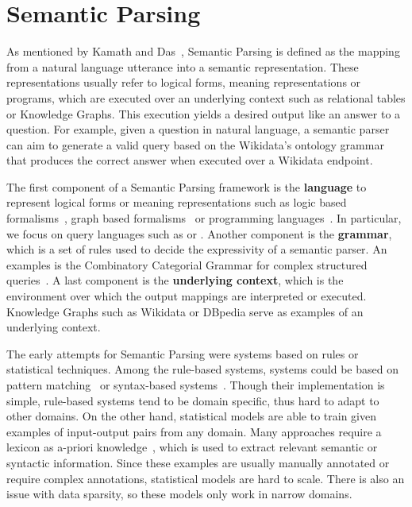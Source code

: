 \section{Semantic Parsing}
\label{cap2:theoFrame/semPar}
As mentioned by Kamath and Das~\cite{semPar:KamathD19}, Semantic Parsing is defined as the 
mapping from a natural language utterance into a semantic representation. These 
representations usually refer to logical forms, meaning representations or programs, which 
are executed over an underlying context such as relational tables or Knowledge Graphs. This 
execution yields a desired output like an answer to a question. For example, given a question 
in natural language, a semantic parser can aim to generate a valid \SPARQL{} query based on the 
Wikidata’s ontology grammar that produces the correct answer when executed over a Wikidata 
endpoint.

The first component of a Semantic Parsing framework is the \textbf{language} to represent 
logical forms or meaning representations such as logic based 
formalisms~\cite{semPar:LiangBLFL16,semPar:ArtziFZ13}, graph based 
formalisms~\cite{semPar:BanarescuBCGGHK13,semPar:OepenKMZCFHU15} or programming 
languages~\cite{semPar:FeurerKESBH15}. In particular, we focus on query languages such as \SQL{} 
or \SPARQL{}. Another component is the \textbf{grammar}, which is a set of rules used to decide the 
expressivity of a semantic parser. An examples is the Combinatory Categorial Grammar for complex 
structured queries~\cite{semPar:steedman1996}. A last component is the \textbf{underlying context}, 
which is the environment over which the output mappings are interpreted or executed. Knowledge 
Graphs such as Wikidata or DBpedia serve as examples of an underlying context.

The early attempts for Semantic Parsing were systems based on rules or statistical techniques. 
Among the rule-based systems, systems could be based on pattern matching~\cite{semPar:Johnson84a} 
or syntax-based systems~\cite{semPar:Woods73}. Though their implementation is simple, 
rule-based systems tend to be domain specific, thus hard to adapt to other domains. On the 
other hand, statistical models are able to train given examples of input-output pairs from 
any domain. Many approaches require a lexicon as a-priori 
knowledge~\cite{semPar:ZelleM96, semPar:ThompsonM03}, which is used to extract relevant 
semantic or syntactic information. Since these examples are usually manually annotated or 
require complex annotations, statistical models are hard to scale. There is also an issue 
with data sparsity, so these models only work in narrow domains.

